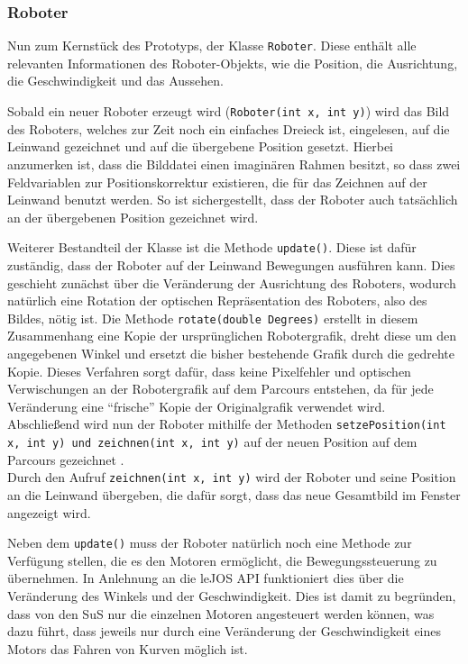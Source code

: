 \documentclass[paper=a4, pagesize, DIV=calc, BCOR=15.5mm, twoside=on, onecolumn=on, open = right, titlepage =on, parskip =half-, headsepline = on, footsepline = on, chapterprefix = on, appendixprefix = off, fontsize = 12pt, numbers = noenddot, abstract = on]{scrbook}
\numberwithin{equation}{chapter}
\theoremstyle{definition}
\theoremstyle{plain}
\theoremstyle{plain}
\theoremstyle{remark}
\theoremstyle{plain}
\theoremstyle{plain}
\begin{document}
\subsubsection{Roboter}
Nun zum Kernstück des Prototyps, der Klasse \texttt{Roboter}. Diese enthält alle relevanten Informationen des Roboter-Objekts, wie die Position, die Ausrichtung, die Geschwindigkeit und das Aussehen.

Sobald ein neuer Roboter erzeugt wird (\texttt{Roboter(int x, int y)}) wird das Bild des Roboters, welches zur Zeit noch ein einfaches Dreieck ist, eingelesen, auf die Leinwand gezeichnet und auf die übergebene Position gesetzt. Hierbei anzumerken ist, dass die Bilddatei einen imaginären Rahmen besitzt, so dass zwei Feldvariablen zur Positionskorrektur existieren, die für das Zeichnen auf der Leinwand benutzt werden. So ist sichergestellt, dass der Roboter auch tatsächlich an der übergebenen Position gezeichnet wird.

Weiterer Bestandteil der Klasse ist die Methode \texttt{update()}. Diese ist dafür zuständig, dass der Roboter auf der Leinwand Bewegungen ausführen kann. Dies geschieht zunächst über die Veränderung der Ausrichtung des Roboters, wodurch natürlich eine Rotation der optischen Repräsentation des Roboters, also des Bildes, nötig ist. Die Methode \texttt{rotate(double Degrees)} erstellt in diesem Zusammenhang eine Kopie der ursprünglichen Robotergrafik, dreht diese um den angegebenen Winkel und ersetzt die bisher bestehende Grafik durch die gedrehte Kopie. Dieses Verfahren sorgt dafür, dass keine Pixelfehler und optischen Verwischungen an der Robotergrafik auf dem Parcours entstehen, da für jede Veränderung eine "`frische"' Kopie der Originalgrafik verwendet wird.\\
Abschließend wird nun der Roboter mithilfe der Methoden \texttt{setzePosition(int x, int y) und \texttt{zeichnen(int x, int y)}} auf der neuen Position auf dem Parcours gezeichnet .\\
Durch den Aufruf \texttt{zeichnen(int x, int y)} wird der Roboter und seine Position an die Leinwand übergeben, die dafür sorgt, dass das neue Gesamtbild im Fenster angezeigt wird.

Neben dem \texttt{update()} muss der Roboter natürlich noch eine Methode zur Verfügung stellen, die es den Motoren ermöglicht, die Bewegungssteuerung zu übernehmen. In Anlehnung an die leJOS API funktioniert dies über die Veränderung des Winkels und der Geschwindigkeit. Dies ist damit zu begründen, dass von den SuS nur die einzelnen Motoren angesteuert werden können, was dazu führt, dass jeweils nur durch eine Veränderung der Geschwindigkeit eines Motors das Fahren von Kurven möglich ist.
\end{document}
